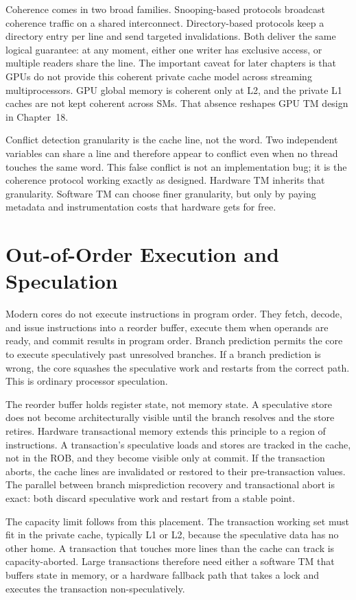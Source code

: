 Coherence comes in two broad families. Snooping-based protocols broadcast
coherence traffic on a shared interconnect. Directory-based protocols keep a
directory entry per line and send targeted invalidations. Both deliver the
same logical guarantee: at any moment, either one writer has exclusive access,
or multiple readers share the line. The important caveat for later chapters is
that GPUs do not provide this coherent private cache model across streaming
multiprocessors. GPU global memory is coherent only at L2, and the private L1
caches are not kept coherent across SMs. That absence reshapes GPU TM design
in Chapter~18.

Conflict detection granularity is the cache line, not the word. Two
independent variables can share a line and therefore appear to conflict even
when no thread touches the same word. This false conflict is not an
implementation bug; it is the coherence protocol working exactly as designed.
Hardware TM inherits that granularity. Software TM can choose finer granularity,
but only by paying metadata and instrumentation costs that hardware gets for
free.

\section{Out-of-Order Execution and Speculation}

Modern cores do not execute instructions in program order. They fetch, decode,
and issue instructions into a reorder buffer, execute them when operands are
ready, and commit results in program order. Branch prediction permits the core
to execute speculatively past unresolved branches. If a branch prediction is
wrong, the core squashes the speculative work and restarts from the correct
path. This is ordinary processor speculation.

The reorder buffer holds register state, not memory state. A speculative store
does not become architecturally visible until the branch resolves and the
store retires. Hardware transactional memory extends this principle to a
region of instructions. A transaction's speculative loads and stores are
tracked in the cache, not in the ROB, and they become visible only at commit.
If the transaction aborts, the cache lines are invalidated or restored to
their pre-transaction values. The parallel between branch misprediction
recovery and transactional abort is exact: both discard speculative work and
restart from a stable point.

The capacity limit follows from this placement. The transaction working set
must fit in the private cache, typically L1 or L2, because the speculative
data has no other home. A transaction that touches more lines than the cache
can track is capacity-aborted. Large transactions therefore need either a
software TM that buffers state in memory, or a hardware fallback path that
takes a lock and executes the transaction non-speculatively.

